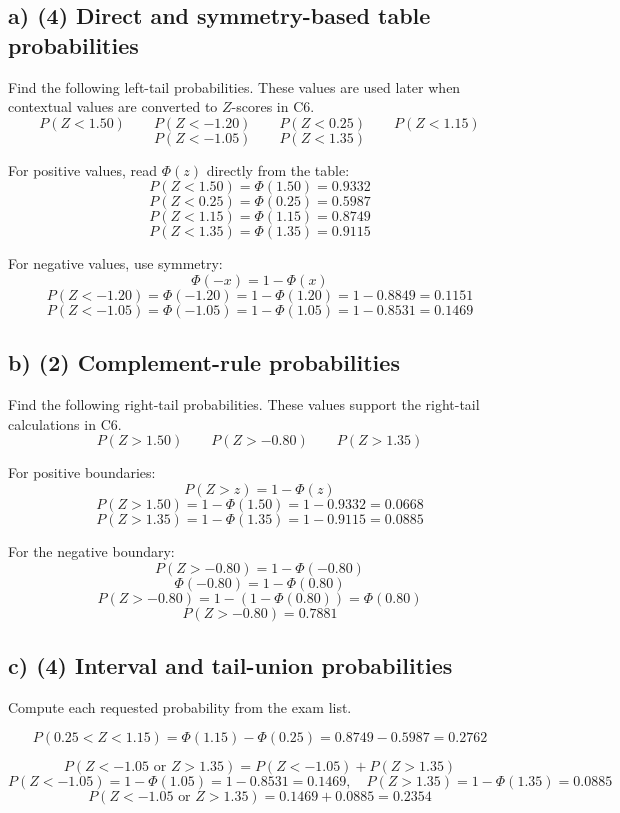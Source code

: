 \subsection*{a) (4) Direct and symmetry-based table probabilities}
\label{subsec:standard-normal-table-problems-c5-a}
Find the following left-tail probabilities. These values are used later when contextual values are converted to \(Z\)-scores in C6.
\[
P(Z<1.50)
\qquad
P(Z<-1.20)
\qquad
P(Z<0.25)
\qquad
P(Z<1.15)
\]
\[
P(Z<-1.05)
\qquad
P(Z<1.35)
\]

For positive values, read \(\Phi(z)\) directly from the table:
\[
P(Z<1.50)=\Phi(1.50)=0.9332
\]
\[
P(Z<0.25)=\Phi(0.25)=0.5987
\]
\[
P(Z<1.15)=\Phi(1.15)=0.8749
\]
\[
P(Z<1.35)=\Phi(1.35)=0.9115
\]

For negative values, use symmetry:
\[
\Phi(-x)=1-\Phi(x)
\]
\[
P(Z<-1.20)=\Phi(-1.20)=1-\Phi(1.20)=1-0.8849=0.1151
\]
\[
P(Z<-1.05)=\Phi(-1.05)=1-\Phi(1.05)=1-0.8531=0.1469
\]


\subsection*{b) (2) Complement-rule probabilities}
\label{subsec:standard-normal-table-problems-c5-b}
Find the following right-tail probabilities. These values support the right-tail calculations in C6.
\[
P(Z>1.50)
\qquad
P(Z>-0.80)
\qquad
P(Z>1.35)
\]

For positive boundaries:
\[
P(Z>z)=1-\Phi(z)
\]
\[
P(Z>1.50)=1-\Phi(1.50)=1-0.9332=0.0668
\]
\[
P(Z>1.35)=1-\Phi(1.35)=1-0.9115=0.0885
\]

For the negative boundary:
\[
P(Z>-0.80)=1-\Phi(-0.80)
\]
\[
\Phi(-0.80)=1-\Phi(0.80)
\]
\[
P(Z>-0.80)=1-\left(1-\Phi(0.80)\right)=\Phi(0.80)
\]
\[
P(Z>-0.80)=0.7881
\]


\subsection*{c) (4) Interval and tail-union probabilities}
\label{subsec:standard-normal-table-problems-c5-c}
Compute each requested probability from the exam list.

\[
P(0.25<Z<1.15)=\Phi(1.15)-\Phi(0.25)=0.8749-0.5987=0.2762
\]

\[
P(Z<-1.05\text{ or }Z>1.35)=P(Z<-1.05)+P(Z>1.35)
\]
\[
P(Z<-1.05)=1-\Phi(1.05)=1-0.8531=0.1469,
\quad
P(Z>1.35)=1-\Phi(1.35)=0.0885
\]
\[
P(Z<-1.05\text{ or }Z>1.35)=0.1469+0.0885=0.2354
\]


